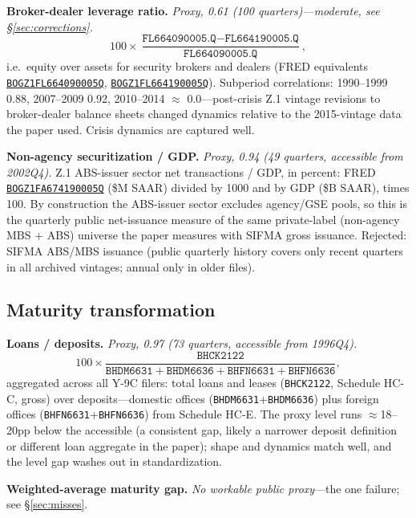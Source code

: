 \documentclass[11pt]{article}
\newcommand{\fred}[1]{\href{https://fred.stlouisfed.org/series/#1}{\texttt{#1}}}
\begin{document}
\textbf{Broker-dealer leverage ratio.} \textit{Proxy, 0.61 (100
quarters)---moderate, see \S\ref{sec:corrections}.}
\begin{equation}
100 \times \frac{\texttt{FL664090005.Q} - \texttt{FL664190005.Q}}
{\texttt{FL664090005.Q}},
\end{equation}
i.e.\ equity over assets for security brokers and dealers (FRED
equivalents \fred{BOGZ1FL664090005Q},
\fred{BOGZ1FL664190005Q}).  Subperiod correlations: 1990--1999 0.88,
2007--2009 0.92, 2010--2014 $\approx$ 0.0---post-crisis Z.1 vintage
revisions to broker-dealer balance sheets changed dynamics relative to
the 2015-vintage data the paper used.  Crisis dynamics are captured
well.

\textbf{Non-agency securitization / GDP.} \textit{Proxy, 0.94 (49
quarters, accessible from 2002Q4).} Z.1 ABS-issuer sector net
transactions / GDP, in percent: FRED \fred{BOGZ1FA674190005Q}
(\$M SAAR) divided by 1000 and by GDP (\$B SAAR), times 100.  By
construction the ABS-issuer sector excludes agency/GSE pools, so this
is the quarterly public net-issuance measure of the same private-label
(non-agency MBS + ABS) universe the paper measures with SIFMA gross
issuance.  Rejected: SIFMA ABS/MBS issuance (public quarterly history
covers only recent quarters in all archived vintages; annual only in
older files).

\subsection{Maturity transformation}

\textbf{Loans / deposits.} \textit{Proxy, 0.97 (73 quarters, accessible
from 1996Q4).}
\begin{equation}
100 \times \frac{\texttt{BHCK2122}}
{\texttt{BHDM6631}+\texttt{BHDM6636}
+\texttt{BHFN6631}+\texttt{BHFN6636}},
\end{equation}
aggregated across all Y-9C filers: total loans and leases
(\texttt{BHCK2122}, Schedule HC-C, gross) over deposits---domestic
offices (\texttt{BHDM6631}+\texttt{BHDM6636}) plus foreign offices
(\texttt{BHFN6631}+\texttt{BHFN6636}) from Schedule HC-E.  The proxy
level runs $\approx$18--20pp below the accessible (a consistent gap,
likely a narrower deposit definition or different loan aggregate in the
paper); shape and dynamics match well, and the level gap washes out in
standardization.

\textbf{Weighted-average maturity gap.} \textit{No workable public
proxy}---the one failure; see \S\ref{sec:misses}.
\end{document}
